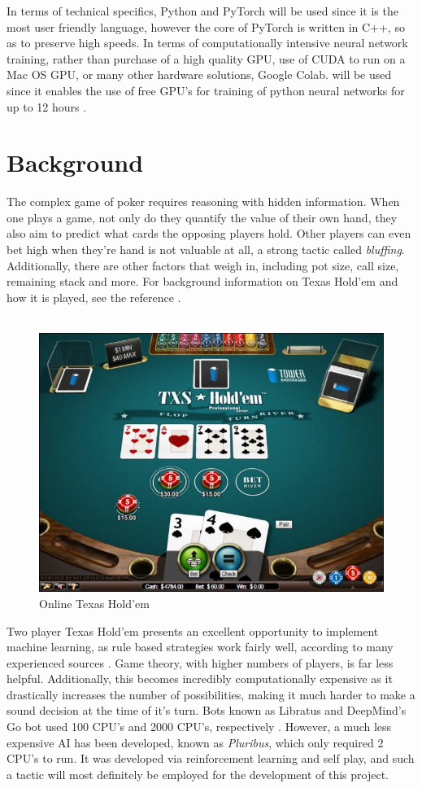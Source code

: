 \documentclass[12pt]{article}
\begin{document}
In terms of technical specifics, Python and PyTorch will be used since it is the most user friendly language, however the core of PyTorch is written in C++, so as to preserve high speeds. In terms of computationally intensive neural network training, rather than purchase of a high quality GPU, use of CUDA to run on a Mac OS GPU, or many other hardware solutions, Google Colab. will be used since it enables the use of free GPU's for training of python neural networks for up to 12 hours \cite{colab}.

\newpage
\tableofcontents
\listoffigures
\newpage

\section{Background}
The complex game of poker requires reasoning with hidden information. When one plays a game, not only do they quantify the value of their own hand, they also aim to predict what cards the opposing players hold. Other players can even bet high when they're hand is not valuable at all, a strong tactic called \textit{bluffing}. Additionally, there are other factors that weigh in, including pot size, call size, remaining stack and more. For background information on Texas Hold'em and how it is played, see the reference \cite{tex}.\\\\
\begin{figure}[H]
    \centering
    \includegraphics[width=.70\linewidth]{figures/texas.jpg}
    \caption{Online Texas Hold'em}
    \label{fig:tex}
\end{figure}
Two player Texas Hold'em presents an excellent opportunity to implement machine learning, as rule based strategies work fairly well, according to many experienced sources \cite{ai}. Game theory, with higher numbers of players, is far less helpful. Additionally, this becomes incredibly computationally expensive as it drastically increases the number of possibilities, making it much harder to make a sound decision at the time of it's turn. Bots known as Libratus and DeepMind's Go bot used 100 CPU's and 2000 CPU's, respectively \cite{ai}. However, a much less expensive AI has been developed, known as \textit{Pluribus}, which only required 2 CPU's to run. It was developed via reinforcement learning and self play, and such a tactic will most definitely be employed for the development of this project. 
\end{document}

